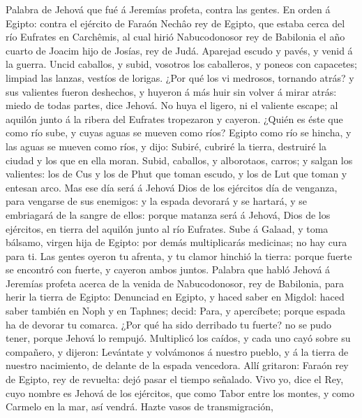  Palabra de Jehová que fué á Jeremías profeta, contra las
gentes.  En orden á Egipto: contra el ejército de Faraón
Nechâo rey de Egipto, que estaba cerca del río Eufrates en Carchêmis, al
cual hirió Nabucodonosor rey de Babilonia el año cuarto de Joacim hijo
de Josías, rey de Judá.  Aparejad escudo y pavés, y venid á
la guerra.  Uncid caballos, y subid, vosotros los
caballeros, y poneos con capacetes; limpiad las lanzas, vestíos de
lorigas.  ¿Por qué los vi medrosos, tornando atrás? y sus
valientes fueron deshechos, y huyeron á más huir sin volver á mirar
atrás: miedo de todas partes, dice Jehová.  No huya el
ligero, ni el valiente escape; al aquilón junto á la ribera del Eufrates
tropezaron y cayeron.  ¿Quién es éste que como río sube, y
cuyas aguas se mueven como ríos?  Egipto como río se hincha,
y las aguas se mueven como ríos, y dijo: Subiré, cubriré la tierra,
destruiré la ciudad y los que en ella moran.  Subid,
caballos, y alborotaos, carros; y salgan los valientes: los de Cus y los
de Phut que toman escudo, y los de Lut que toman y entesan arco.
 Mas ese día será á Jehová Dios de los ejércitos día de
venganza, para vengarse de sus enemigos: y la espada devorará y se
hartará, y se embriagará de la sangre de ellos: porque matanza será á
Jehová, Dios de los ejércitos, en tierra del aquilón junto al río
Eufrates.  Sube á Galaad, y toma bálsamo, virgen hija de
Egipto: por demás multiplicarás medicinas; no hay cura para ti.
 Las gentes oyeron tu afrenta, y tu clamor hinchió la
tierra: porque fuerte se encontró con fuerte, y cayeron ambos juntos.
 Palabra que habló Jehová á Jeremías profeta acerca de la
venida de Nabucodonosor, rey de Babilonia, para herir la tierra de
Egipto:  Denunciad en Egipto, y haced saber en Migdol:
haced saber también en Noph y en Taphnes; decid: Para, y apercíbete;
porque espada ha de devorar tu comarca.  ¿Por qué ha sido
derribado tu fuerte? no se pudo tener, porque Jehová lo rempujó.
 Multiplicó los caídos, y cada uno cayó sobre su compañero,
y dijeron: Levántate y volvámonos á nuestro pueblo, y á la tierra de
nuestro nacimiento, de delante de la espada vencedora. 
Allí gritaron: Faraón rey de Egipto, rey de revuelta: dejó pasar el
tiempo señalado.  Vivo yo, dice el Rey, cuyo nombre es
Jehová de los ejércitos, que como Tabor entre los montes, y como Carmelo
en la mar, así vendrá.  Hazte vasos de transmigración,
